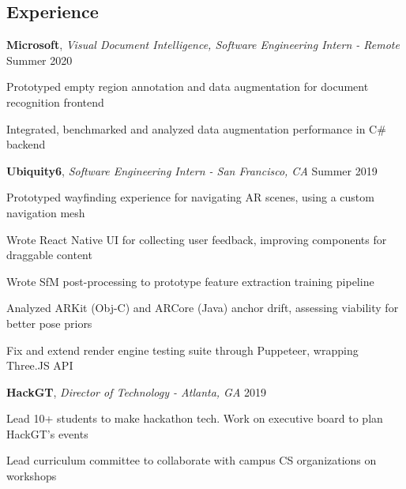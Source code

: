 \subsection*{Experience}
\headerrow
    {\textbf{Microsoft}, \emph{Visual Document Intelligence, Software Engineering Intern - Remote}}
    {Summer 2020}
\begin{itemize*}
	\item Prototyped empty region annotation and data augmentation for document recognition frontend
    \item Integrated, benchmarked and analyzed data augmentation performance in C\# backend
\end{itemize*}
\headerrow
	{\textbf{Ubiquity6}, \emph{Software Engineering Intern - San Francisco, CA}}
    {Summer 2019}
\begin{itemize*}
	\item Prototyped wayfinding experience for navigating AR scenes, using a custom navigation mesh
    \item Wrote React Native UI for collecting user feedback, improving components for draggable content
    \item Wrote SfM post-processing to prototype feature extraction training pipeline
    \item Analyzed ARKit (Obj-C) and ARCore (Java) anchor drift, assessing viability for better pose priors
    \item Fix and extend render engine testing suite through Puppeteer, wrapping Three.JS API
\end{itemize*}
\headerrow
    {\textbf{HackGT}, \emph{Director of Technology - Atlanta, GA}}
    {2019}
\begin{itemize*}
    \item Lead 10+ students to make hackathon tech. Work on executive board to plan HackGT's events
    \item Lead curriculum committee to collaborate with campus CS organizations on workshops
\end{itemize*}

